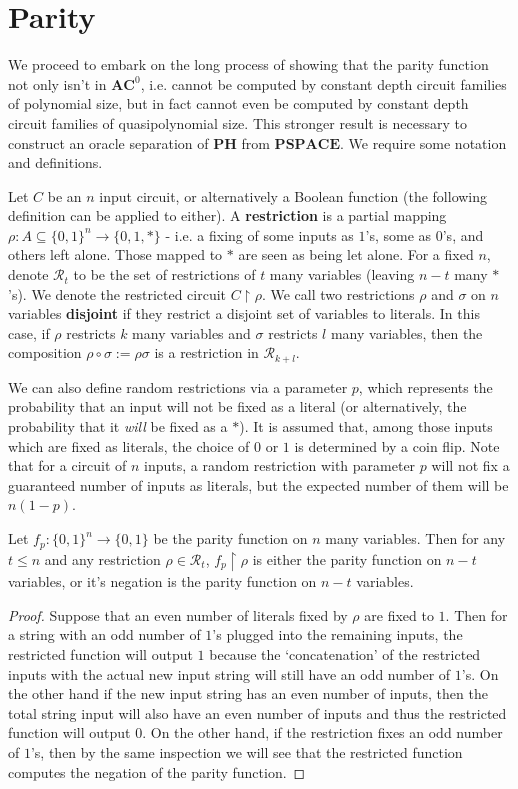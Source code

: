 \section{Parity}
We proceed to embark on the long process of showing that the parity function not only isn't in $\bm{AC}^0$, i.e. cannot be computed by constant depth circuit families of polynomial size, but in fact cannot even be computed by constant depth circuit families of quasipolynomial size. This stronger result is necessary to construct an oracle separation of $\bm{PH}$ from $\bm{PSPACE}$. We require some notation and definitions.
\begin{definition}
	Let $C$ be an $n$ input circuit, or alternatively a Boolean function (the following definition can be applied to either). A \textbf{restriction} is a partial mapping $\rho: A \subseteq \{0,1\}^n \to \{0,1,*\}$ - i.e. a fixing of some inputs as $1$'s, some as $0$'s, and others left alone. Those mapped to $*$ are seen as being let alone. For a fixed $n$, denote $\mathcal{R}_t$ to be the set of restrictions of $t$ many variables (leaving $n-t$ many $*$'s). We denote the restricted circuit $C \restriction \rho$. We call two restrictions $\rho$ and $\sigma$ on $n$ variables \textbf{disjoint} if they restrict a disjoint set of variables to literals. In this case, if $\rho$ restricts $k$ many variables and $\sigma$ restricts $l$ many variables, then the composition $\rho \circ \sigma := \rho\sigma$ is a restriction in $\mathcal{R}_{k+l}$. \par 
	We can also define random restrictions via a parameter $p$, which represents the probability that an input will not be fixed as a literal (or alternatively, the probability that it \emph{will} be fixed as a $*$). It is assumed that, among those inputs which are fixed as literals, the choice of $0$ or $1$ is determined by a coin flip. Note that for a circuit of $n$ inputs, a random restriction with parameter $p$ will not fix a guaranteed number of inputs as literals, but the expected number of them will be $n(1-p)$. 
\end{definition}
\begin{fact}
	Let $f_p:\{0,1\}^n \to \{0,1\}$ be the parity function on $n$ many variables. Then for any $t \leq n$ and any restriction $\rho \in \mathcal{R}_t$, $f_p \restriction \rho$ is either the parity function on $n-t$ variables, or it's negation is the parity function on $n-t$ variables. 
\end{fact}
\begin{proof}
	Suppose that an even number of literals fixed by $\rho$ are fixed to $1$. Then for a string with an odd number of $1$'s plugged into the remaining inputs, the restricted function will output $1$ because the `concatenation' of the restricted inputs with the actual new input string will still have an odd number of $1$'s. On the other hand if the new input string has an even number of inputs, then the total string input will also have an even number of inputs and thus the restricted function will output $0$. 	On the other hand, if the restriction fixes an odd number of $1$'s, then by the same inspection we will see that the restricted function computes the negation of the parity function. \par 
\end{proof}
